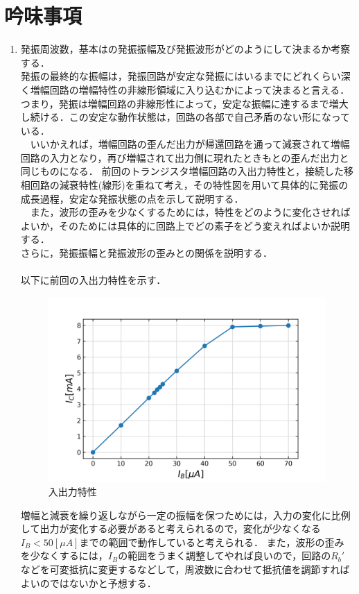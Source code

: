 \documentclass[10pt, a4j, dvipdfmx]{jarticle}
\makeatletter
\newcommand{\figcaption}[1]{\def\@captype{figure}\caption{#1}}
\makeatother
\begin{document}
      \section{吟味事項}
      \begin{enumerate}
          \item 発振周波数，基本はの発振振幅及び発振波形がどのようにして決まるか考察する．\\
                発振の最終的な振幅は，発振回路が安定な発振にはいるまでにどれくらい深く増幅回路の増幅特性の非線形領域に入り込むかによって決まると言える．
                つまり，発振は増幅回路の非線形性によって，安定な振幅に達するまで増大し続ける．この安定な動作状態は，回路の各部で自己矛盾のない形になっている．\\
                ~~いいかえれば，増幅回路の歪んだ出力が帰還回路を通って減衰されて増幅回路の入力となり，再び増幅されて出力側に現れたときもとの歪んだ出力と同じものになる．
                前回のトランジスタ増幅回路の入出力特性と，接続した移相回路の減衰特性(線形)を重ねて考え，その特性図を用いて具体的に発振の成長過程，安定な発振状態の点を示して説明する．\\
                ~~また，波形の歪みを少なくするためには，特性をどのように変化させればよいか，そのためには具体的に回路上でどの素子をどう変えればよいか説明する．\\
                さらに，発振振幅と発振波形の歪みとの関係を説明する．\\
                \\
                以下に前回の入出力特性を示す．
                \begin{figure}[H]
                    \centering
                    \includegraphics[width=\hsize]{ib-ic.png}
                    \figcaption{入出力特性}
                \end{figure}
                増幅と減衰を繰り返しながら一定の振幅を保つためには，入力の変化に比例して出力が変化する必要があると考えられるので，変化が少なくなる$I_B < 50[μA]$までの範囲で動作していると考えられる．
                また，波形の歪みを少なくするには，$I_B$の範囲をうまく調整してやれば良いので，回路の$R_b'$などを可変抵抗に変更するなどして，周波数に合わせて抵抗値を調節すればよいのではないかと予想する．


\end{enumerate}
\end{document}
